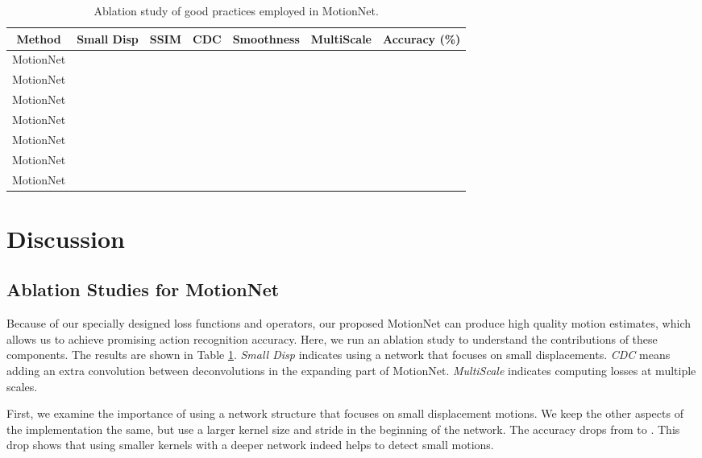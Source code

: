 \documentclass[runningheads]{llncs}
\begin{document}
		\begin{table}[t]
			\begin{center}
				\caption{Ablation study of good practices employed in MotionNet. \label{tab:ablation}}
\begin{tabular}{  c | c | c| c | c | c | c }
						\hline
						Method								  &    Small Disp    &    SSIM    & CDC    &    Smoothness    &    {\color{black}MultiScale} &    Accuracy (\%) \\
						\hline		
						MotionNet							&    &     &     &    &    &        \\		
						MotionNet							&    &     &     &    &    & {\color{black} }      \\	
						MotionNet							&    &     &     &    &    &        \\		
						MotionNet							&    &     &     &    &    &        \\		
						MotionNet							&    &     &     &    &   &         \\		
						MotionNet							&    &     &     &    &    &        \\		
						MotionNet							&    &     &     &    &    &        \\		
						\hline
					\end{tabular}
\end{center}
		\end{table} 
		
		\section{Discussion}
		\label{sec:discussion}
		
		\subsection{Ablation Studies for MotionNet} 
		\label{sec:ablation}
		Because of our specially designed loss functions and operators, our proposed MotionNet can produce high quality motion estimates, which allows us to achieve promising action recognition accuracy. Here, we run an ablation study to understand the contributions of these components. The results are shown in Table \ref{tab:ablation}. \textit{Small Disp} indicates using a network that focuses on small displacements. \textit{CDC} means adding an extra convolution between deconvolutions in the expanding part of MotionNet. {\color{black} \textit{MultiScale} indicates computing losses at multiple scales. }
		
		First, we examine the importance of using a network structure that focuses on small displacement motions. We keep the other aspects of the implementation the same, but use a larger kernel size and stride in the beginning of the network. The accuracy drops from  to . This drop shows that using smaller kernels with a deeper network indeed helps to detect small motions. 
		
\end{document}
